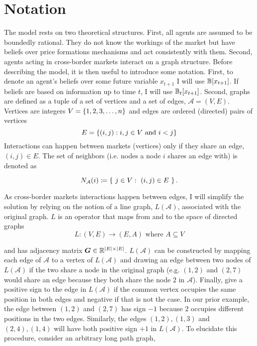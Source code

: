 \section{Notation}
The model rests on two theoretical structures. First, all agents are assumed to be boundedly rational. They do not know the workings of the market but have beliefs over price formations mechanisms and act consistently with them. Second, agents acting in cross-border markets interact on a graph structure. Before describing the model, it is then useful to introduce some notation. First, to denote an agent's beliefs over some future variable $x_{t+1}$ I will use $\mathbb{B}[x_{t+1}]$. If beliefs are based on information up to time $t$, I will use $\mathbb{B}_t[x_{t+1}]$. Second, graphs are defined as a tuple of a set of vertices and a set of edges, $\mathcal{A} = (V, E)$. Vertices are integers $V = \left\{1, 2, 3, \ldots, n\right\}$ and edges are ordered (directed) pairs of vertices \begin{equation*}E = \left\{(i, j) : i, j \in V \text{ and } i < j\right\}\end{equation*}  Interactions can happen between markets (vertices) only if they share an edge, $(i, j) \in E$. The set of neighbors (i.e. nodes a node $i$ shares an edge with) is denoted as

\begin{equation}
  N_{\mathcal{A}}(i) \coloneqq \left\{ \ j \in V: \ (i, j) \in E \ \right\}.
\end{equation}


As cross-border markets interactions happen between edges, I will simplify the solution by relying on the notion of a line graph, $L(\mathcal{A})$, associated with the original graph. $L$ is an operator that maps from and to the space of directed graphs
\begin{equation}
  L: (V, E) \to (E, A) \text{ where } A \subseteq V
\end{equation}


and has adjacency matrix $\bm{G} \in \mathbb{R}^{\lvert E\rvert\times \lvert E\rvert}$. $L(\mathcal{A})$ can be constructed by mapping each edge of $\mathcal{A}$ to a vertex of $L(\mathcal{A})$ and drawing an edge between two nodes of $L(\mathcal{A})$ if the two share a node in the original graph (e.g. $(1, 2)$ and $(2, 7)$ would share an edge because they both share the node $2$ in $\mathcal{A}$). Finally, give a positive sign to the edge in $L(\mathcal{A})$ if the common vertex occupies the same position in both edges and negative if that is not the case. In our prior example, the edge between $(1, 2)$ and $(2, 7)$ has sign $-1$ because $2$ occupies different positions in the two edges. Similarly, the edges $(1, 2), (1, 3)$ and $(2, 4), (1, 4)$ will have both positive sign $+1$ in $L(\mathcal{A})$. To elucidate this procedure, consider an arbitrary long path graph,

